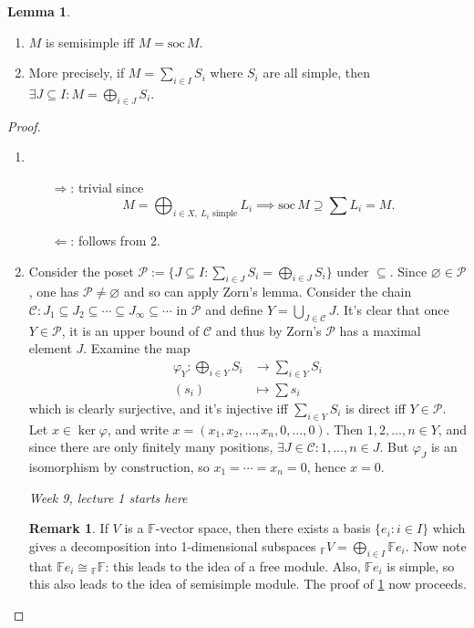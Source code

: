 \documentclass[a4paper]{article}
\newcommand{\F}{\mathbb{F}}
\newcommand{\soc}{\text{soc}\,}
\theoremstyle{definition}
\newtheorem{lemma}[defn]{Lemma}
\newtheorem*{remark}{Remark}
\begin{document}
\begin{lemma}
\label{lemma:MsemisimpiffMissocM}
\begin{enumerate}
\item $M$ is semisimple iff $M=\soc M$.
\item More precisely, if $M=\sum_{i\in I}S_i$ where $S_i$ are all simple, then $\exists J\subseteq I:M=\bigoplus_{i\in J} S_i$.
\end{enumerate}
\end{lemma}
\begin{proof}
\begin{enumerate}
\item \begin{itemize}
\item[$\Rightarrow$:] trivial since
\[
M=\bigoplus_{i\in X,\ L_i\text{ simple}} L_i \implies \soc M\supseteq \sum L_i=M.
\]
\item[$\Leftarrow$:] follows from 2.
\end{itemize}
\item Consider the poset $\mathcal P:=\{J\subseteq I:\sum_{i\in J}S_i=\bigoplus_{i\in J}S_i\}$ under $\subseteq$. Since $\varnothing\in\mathcal P$, one has $\mathcal P\neq\varnothing$ and so can apply Zorn's lemma. Consider the chain $\mathcal C:J_1\subseteq J_2\subseteq\cdots\subseteq J_\infty\subseteq\cdots$ in $\mathcal P$ and define $Y=\bigcup_{J\in \mathcal C}J$. It's clear that once $Y\in\mathcal P$, it is an upper bound of $\mathcal C$ and thus by Zorn's $\mathcal P$ has a maximal element $J$. Examine the map
\[
\begin{aligned}
\varphi_Y:\bigoplus_{i\in Y} S_i&\rightarrow \sum_{i\in Y} S_i\\
(s_i)&\mapsto \sum s_i
\end{aligned}
\]
which is clearly surjective, and it's injective iff $\sum_{i\in Y} S_i$ is direct iff $Y\in\mathcal P$. Let $x\in\ker\varphi$, and write $x=(x_1,x_2,\ldots,x_n,0,\ldots,0)$. Then $1,2,\ldots,n\in Y$, and since there are only finitely many positions, $\exists J\in\mathcal C:1,\ldots,n\in J$. But $\varphi_J$ is an isomorphism by construction, so $x_1=\cdots=x_n=0$, hence $x=0$.

\begin{flushright}
\textit{Week 9, lecture 1 starts here}
\end{flushright}

\begin{remark}
If $V$ is a $\F$-vector space, then there exists a basis $\{e_i:i\in I\}$ which gives a decomposition into 1-dimensional subspaces $_\F V=\bigoplus_{i\in I} \F e_i$. Now note that $\F e_i\cong {}_\F \F$: this leads to the idea of a free module. Also, $\F e_i$ is simple, so this also leads to the idea of semisimple module. The proof of \ref{lemma:MsemisimpiffMissocM} now proceeds.
\end{remark}


\end{enumerate}
\end{proof}
\end{document}
